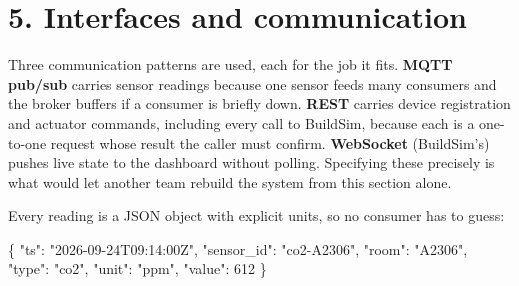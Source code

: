 \documentclass[
  11pt,
]{article}
\newenvironment{Shaded}{}{}
\newcommand{\DataTypeTok}[1]{\textcolor[rgb]{0.56,0.13,0.00}{#1}}
\newcommand{\DecValTok}[1]{\textcolor[rgb]{0.25,0.63,0.44}{#1}}
\newcommand{\FunctionTok}[1]{\textcolor[rgb]{0.02,0.16,0.49}{#1}}
\newcommand{\StringTok}[1]{\textcolor[rgb]{0.25,0.44,0.63}{#1}}
\begin{document}
\hypertarget{interfaces-and-communication}{%
\section{5. Interfaces and
communication}\label{interfaces-and-communication}}

Three communication patterns are used, each for the job it fits.
\textbf{MQTT pub/sub} carries sensor readings because one sensor feeds
many consumers and the broker buffers if a consumer is briefly down.
\textbf{REST} carries device registration and actuator commands, including every call to BuildSim, because each is a one-to-one
request whose result the caller must confirm. \textbf{WebSocket}
(BuildSim's) pushes live state to the dashboard without polling.
Specifying these precisely is what would let another team rebuild the
system from this section alone.

Every reading is a JSON object with explicit units, so no consumer has
to guess:

\begin{Shaded}
\begin{Highlighting}[]
\FunctionTok{\{}
  \DataTypeTok{"ts"}\FunctionTok{:} \StringTok{"2026{-}09{-}24T09:14:00Z"}\FunctionTok{,}
  \DataTypeTok{"sensor\_id"}\FunctionTok{:} \StringTok{"co2{-}A2306"}\FunctionTok{,}
  \DataTypeTok{"room"}\FunctionTok{:} \StringTok{"A2306"}\FunctionTok{,}
  \DataTypeTok{"type"}\FunctionTok{:} \StringTok{"co2"}\FunctionTok{,}
  \DataTypeTok{"unit"}\FunctionTok{:} \StringTok{"ppm"}\FunctionTok{,}
  \DataTypeTok{"value"}\FunctionTok{:} \DecValTok{612}
\FunctionTok{\}}
\end{Highlighting}
\end{Shaded}
\end{document}
